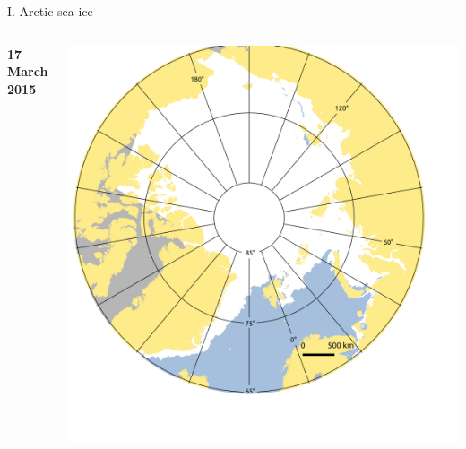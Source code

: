 \documentclass[8pt]{beamer}
\begin{document}
\setwatermark{\fontsize{125pt}{125pt}\selectfont{}}
\begin{frame}[fragile]{I. Arctic sea ice}
	\begin{columns}
			\begin{center}
				\textbf{17 March 2015}
			\end{center}
			\includegraphics[width=1\textwidth]{./img/ArcticSI_Mar2015_SI_noLeg.pdf}\\
			

\end{columns}
\end{frame}
\end{document}
